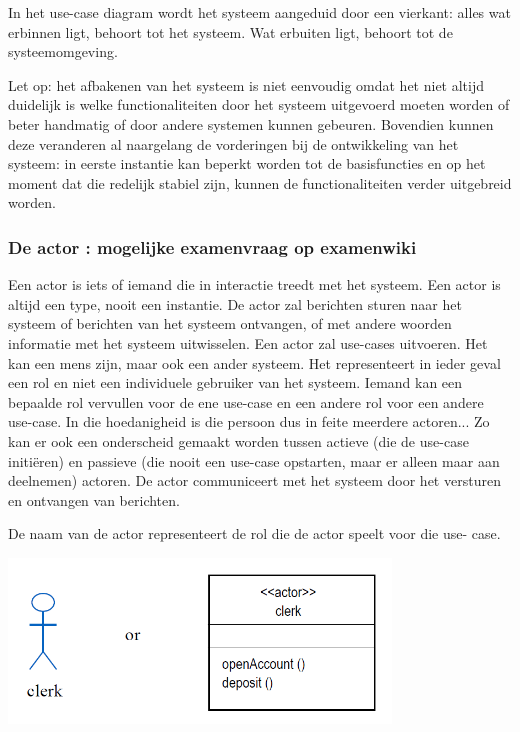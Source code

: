 In het use-case diagram wordt het systeem aangeduid door een vierkant: alles wat erbinnen ligt, behoort tot het systeem. Wat erbuiten ligt, behoort tot de systeemomgeving.

Let op: het afbakenen van het systeem is niet eenvoudig omdat het niet altijd duidelijk is welke functionaliteiten door het systeem uitgevoerd moeten worden of beter handmatig of door andere systemen kunnen gebeuren. Bovendien kunnen deze veranderen al naargelang de vorderingen bij de ontwikkeling van het systeem: in eerste instantie kan beperkt worden tot de basisfuncties en op het moment dat die redelijk stabiel zijn, kunnen de functionaliteiten verder uitgebreid worden.

\subsubsection{De actor : mogelijke examenvraag op examenwiki}

Een actor is iets of iemand die in interactie treedt met het systeem. Een actor is altijd een type, nooit een instantie. De actor zal berichten sturen naar het systeem of berichten van het systeem ontvangen, of met andere woorden informatie met het systeem uitwisselen. Een actor zal use-cases uitvoeren. Het kan een mens zijn, maar ook een ander systeem. Het representeert in ieder geval een rol en niet een individuele gebruiker van het systeem. Iemand kan een bepaalde rol vervullen voor de ene use-case en een andere rol voor een andere use-case. In die hoedanigheid is die persoon dus in feite meerdere actoren... Zo kan er ook een onderscheid gemaakt worden tussen actieve (die de use-case initiëren) en passieve (die nooit een use-case opstarten, maar er alleen maar aan deelnemen) actoren.
De actor communiceert met het systeem door het versturen en ontvangen van berichten.

De naam van de actor representeert de rol die de actor speelt voor die use- case.


\begin{center}
\includegraphics[width=4in]{img/actor3}%
\end{center}

